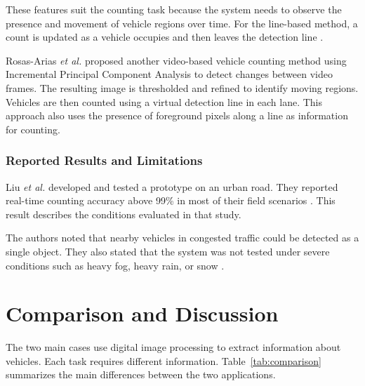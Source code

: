 \documentclass[conference]{IEEEtran}
\begin{document}
	These features suit the counting task because the system needs to
	observe the presence and movement of vehicle regions over time. For the
	line-based method, a count is updated as a vehicle occupies and then
	leaves the detection line \cite{liu2017}.
	
	Rosas-Arias \textit{et al.} \cite{rosas2019} proposed another
	video-based vehicle counting method using Incremental Principal
	Component Analysis to detect changes between video frames. The
	resulting image is thresholded and refined to identify moving regions.
	Vehicles are then counted using a virtual detection line in each lane.
	This approach also uses the presence of foreground pixels along a line
	as information for counting.
	
	\subsubsection{Reported Results and Limitations}
	
	Liu \textit{et al.} developed and tested a prototype on an urban road.
	They reported real-time counting accuracy above 99\% in most of their
	field scenarios \cite{liu2017}. This result describes the conditions
	evaluated in that study.
	
	The authors noted that nearby vehicles in congested traffic could be
	detected as a single object. They also stated that the system was not
	tested under severe conditions such as heavy fog, heavy rain, or snow
	\cite{liu2017}.
	
	

	\section{Comparison and Discussion}
	
	The two main cases use digital image processing to extract information
	about vehicles. Each task requires different information.
	Table~\ref{tab:comparison} summarizes the main differences between the
	two applications.
	
\end{document}
